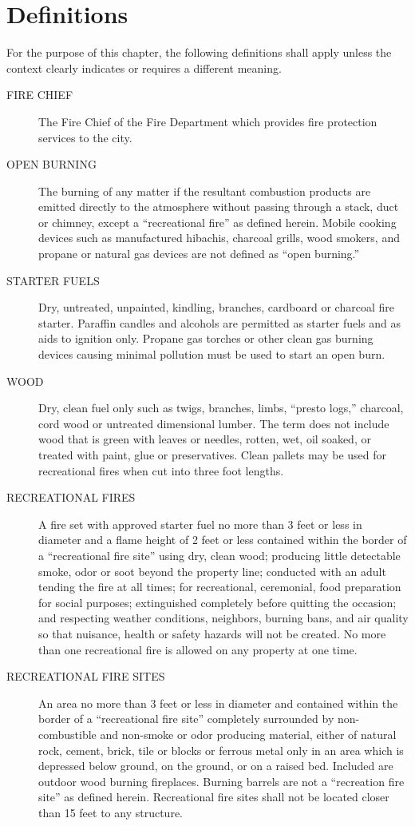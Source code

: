 \documentclass[code.tex]{subfiles}
\begin{document}
\section{Definitions}
For the purpose of this chapter, the following definitions shall apply unless the context clearly indicates or requires a different meaning.
\begin{description}
    \item[FIRE CHIEF] The Fire Chief of the Fire Department which provides fire protection services to the city.
    \item[OPEN BURNING] The burning of any matter if the resultant combustion products are emitted directly to the atmosphere without passing through a stack, duct or chimney, except a “recreational fire” as defined herein. Mobile cooking devices such as manufactured hibachis, charcoal grills, wood smokers, and propane or natural gas devices are not defined as “open burning.”  
    \item[STARTER FUELS] Dry, untreated, unpainted, kindling, branches, cardboard or charcoal fire starter. Paraffin candles and alcohols are permitted as starter fuels and as aids to ignition only.  Propane gas torches or other clean gas burning devices causing minimal pollution must be used to start an open burn.
    \item[WOOD] Dry, clean fuel only such as twigs, branches, limbs, “presto logs,” charcoal, cord wood or untreated dimensional lumber. The term does not include wood that is green with leaves or needles, rotten, wet, oil soaked, or treated with paint, glue or preservatives. Clean pallets may be used for recreational fires when cut into three foot lengths.
    \item[RECREATIONAL FIRES] A fire set with approved starter fuel no more than 3 feet or less in diameter and a flame height of 2 feet or less contained within the border of a “recreational fire site” using dry, clean wood; producing little detectable smoke, odor or soot beyond the property line; conducted with an adult tending the fire at all times; for recreational, ceremonial, food preparation for social purposes; extinguished completely before quitting the occasion; and respecting weather conditions, neighbors, burning bans, and air quality so that nuisance, health or safety hazards will not be created. No more than one recreational fire is allowed on any property at one time.
    \item[RECREATIONAL FIRE SITES] An area no more than 3 feet or less in diameter and contained within the border of a “recreational fire site” completely surrounded by non-combustible and non-smoke or odor producing material, either of natural rock, cement, brick, tile or blocks or ferrous metal only in an area which is depressed below ground, on the ground, or on a raised bed. Included are outdoor wood burning fireplaces. Burning barrels are not a “recreation fire site” as defined herein. Recreational fire sites shall not be located closer than 15 feet to any structure.
\end{description}
\end{document}
